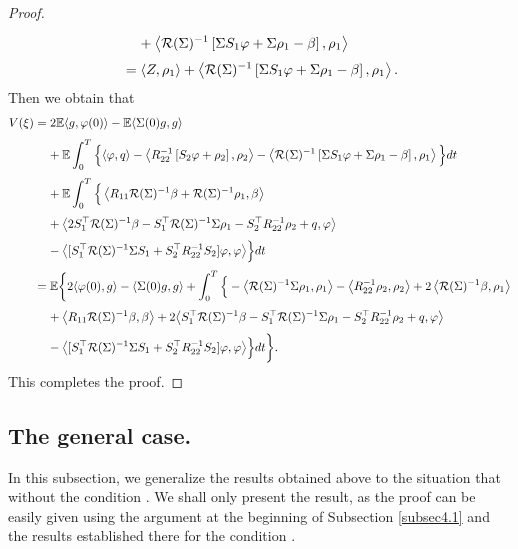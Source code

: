 \documentclass[11pt,times,twoside]{article}
\def\dbE{\mathbb{E}} \def\sE{\mathscr{E}} \def\fE{\mathfrak{E}} \def\cE{{\cal E}} \def\BE{{\bf E}} \def\Be{{\bf e}}
\begin{document}
\begin{proof}
\begin{align*}
%
\ns\ds &\hp{=\ } +\left\lan\mathcal{R}(\Si)^{-1}\left[\Si S_{1} \varphi
+\Si\rho_1 -\beta\right],\rho_1 \right\ran\\
%
\ns\ds &=\left\lan Z,\rho_1\right\ran+\left\lan \mathcal{R}(\Si)^{-1}\left[\Si S_{1} \varphi+\Si\rho_1 -\beta\right],\rho_1 \right\ran.
\end{align*}
%
Then we obtain that
%
\begin{align*}
\ds V(\xi) &=2\dbE \lan g, \f(0)\ran-\dbE \lan \Si(0)g, g\ran\\
%
\ns\ds &\hp{=\ }  +\dbE  \int_{0}^{T} \Big\{\lan\f,q\ran
 -\left\lan R_{22}^{-1}\left[S_{2} \varphi+\rho_2 \right],\rho_2 \right\ran
 -\left\lan \mathcal{R}(\Si)^{-1}\left[\Si S_{1} \varphi+\Si\rho_1 -\beta\right],
 \rho_1 \right\ran \Big\} dt\\
%
\ns\ds &\hp{=\ } + \dbE\int_{0}^{T}\Big\{\left\lan  R_{11} \mathcal{R}(\Si)^{-1} \beta
+\mathcal{R}(\Si)^{-1}\rho_1, \beta\right\ran \\
%
\ns\ds &\hp{=\ }  +\big\lan  2S_{1}^{\top} \mathcal{R}(\Si)^{-1} \beta
-S_{1}^{\top} \mathcal{R}(\Si)^{-1} \Si\rho_1-S_{2}^{\top} R_{22}^{-1}\rho_2+q, \varphi\big\ran \\
%
\ns\ds &\hp{=\ }
-\big\lan[S_{1}^{\top} \mathcal{R}(\Si)^{-1} \Si S_{1}+S_{2}^{\top} R_{22}^{-1} S_{2}] \varphi, \varphi\big\ran \Big\} d t\\
%
\ns\ds &=\dbE\bigg\{2\lan\f(0),g\ran- \lan\Si(0)g,g\ran+\int_0^T \Big\{
 -\left\lan \mathcal{R}(\Si)^{-1}\Si\rho_1, \rho_1 \right\ran
 -\left\lan R_{22}^{-1}\rho_2,\rho_2 \right\ran
 +2\left\lan \mathcal{R}(\Si)^{-1}\beta, \rho_1 \right\ran \\
%
\ns\ds &\hp{=\ } +\left\lan R_{11} \mathcal{R}(\Si)^{-1}\beta, \beta\right\ran
+2\big\lan S_{1}^{\top} \mathcal{R}(\Si)^{-1} \beta
-S_{1}^{\top} \mathcal{R}(\Si)^{-1} \Si\rho_1-S_{2}^{\top} R_{22}^{-1}\rho_2+q, \varphi\big\ran\\
%
\ns\ds &\hp{=\ } -\big\lan [S_{1}^{\top} \mathcal{R}(\Si)^{-1}\Si S_{1}+S_{2}^{\top} R_{22}^{-1} S_{2} ] \varphi, \varphi\big\ran\Big\} dt\bigg\}.
%
\end{align*}
%
This completes the proof.
%
\end{proof}


%
\subsection{The general case.}

In this subsection, we generalize the results obtained above to the situation that without the condition . We shall only present the result, as the proof can be easily given using the argument at the beginning of Subsection \ref{subsec4.1} and the results established there for the condition .
\end{document}
